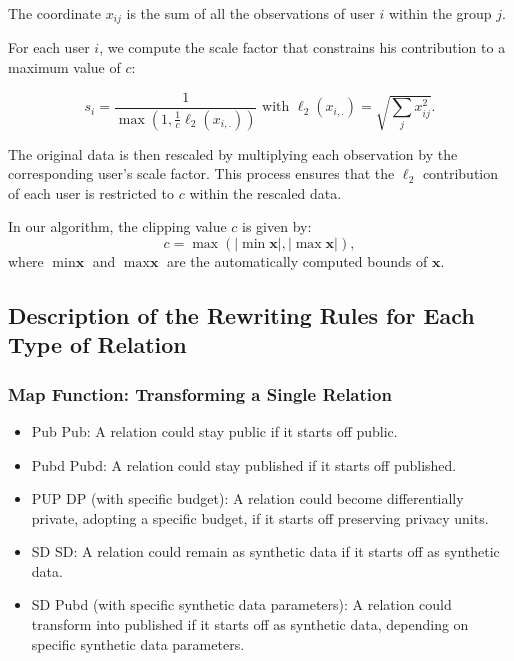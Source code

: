 \documentclass[letterpaper]{article} %
\begin{document}
The coordinate $x_{ij}$ is the sum of all the observations of user $i$ within the group $j$.

For each user $i$, we compute the scale factor that constrains his contribution to a maximum value of $c$:

\begin{equation}
	s_i = \frac{1}{\max ( 1, \frac{1}{c} \ell_2(x_{i,.}) )} \text{  with  } \ell_2(x_{i,.}) = \sqrt{\sum_j x^2_{ij}}.
\end{equation}

The original data is then rescaled by multiplying each observation by the corresponding user's scale factor.
This process ensures that the $\ell_2$ contribution of each user is restricted to $c$ within the rescaled data.

In our algorithm, the clipping value $c$ is given by:
\begin{equation}
    c = \max ( |\min \textbf{x}|, |\max \textbf{x}|),
\end{equation}
where $\min \textbf{x}$ and $\max \textbf{x}$ are the automatically computed bounds of $\textbf{x}$.

\bigskip
\subsection*{Description of the Rewriting Rules for Each Type of Relation}
\label{sec:rewriting_rules}

\subsubsection*{Map Function: Transforming a Single Relation}
\begin{itemize}
    \item Pub \textrightarrow{} Pub: A relation could stay public if it starts off public.
    \item Pubd \textrightarrow{} Pubd: A relation could stay published if it starts off published.
    \item PUP \textrightarrow{} DP (with specific budget): A relation could become differentially private, adopting a specific budget, if it starts off preserving privacy units.
    \item SD \textrightarrow{} SD: A relation could remain as synthetic data if it starts off as synthetic data.
    \item SD \textrightarrow{} Pubd (with specific synthetic data parameters): A relation could transform into published if it starts off as synthetic data, depending on specific synthetic data parameters.
\end{itemize}
\end{document}
